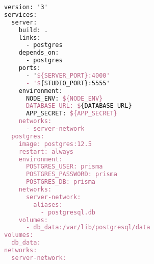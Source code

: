 \begin{lstlisting}[language=TeX]
version: '3'
services:
  server:
    build: .
    links:
      - postgres
    depends_on:
      - postgres
    ports:
      - '${SERVER_PORT}:4000'
      - '${STUDIO_PORT}:5555'
    environment:
      NODE_ENV: ${NODE_ENV}
      DATABASE_URL: ${DATABASE_URL}
      APP_SECRET: ${APP_SECRET}
    networks:
      - server-network
  postgres:
    image: postgres:12.5
    restart: always
    environment:
      POSTGRES_USER: prisma
      POSTGRES_PASSWORD: prisma
      POSTGRES_DB: prisma
    networks:
      server-network:
        aliases:
          - postgresql.db
    volumes:
      - db_data:/var/lib/postgresql/data
volumes:
  db_data:
networks:
  server-network:
\end{lstlisting}

